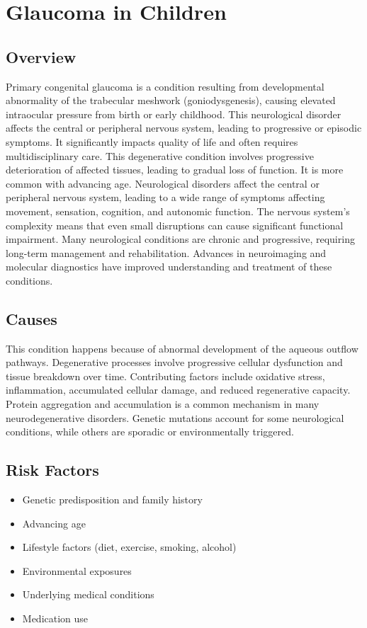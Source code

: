 \chapter{Glaucoma in Children}
\label{sec:Glaucoma in Children}

\section{Overview}
Primary congenital glaucoma is a condition resulting from developmental abnormality of the trabecular meshwork (goniodysgenesis), causing elevated intraocular pressure from birth or early childhood. This neurological disorder affects the central or peripheral nervous system, leading to progressive or episodic symptoms. It significantly impacts quality of life and often requires multidisciplinary care. This degenerative condition involves progressive deterioration of affected tissues, leading to gradual loss of function. It is more common with advancing age. Neurological disorders affect the central or peripheral nervous system, leading to a wide range of symptoms affecting movement, sensation, cognition, and autonomic function. The nervous system's complexity means that even small disruptions can cause significant functional impairment. Many neurological conditions are chronic and progressive, requiring long-term management and rehabilitation. Advances in neuroimaging and molecular diagnostics have improved understanding and treatment of these conditions.
\section{Causes}
This condition happens because of abnormal development of the aqueous outflow pathways.   Degenerative processes involve progressive cellular dysfunction and tissue breakdown over time. Contributing factors include oxidative stress, inflammation, accumulated cellular damage, and reduced regenerative capacity.  Protein aggregation and accumulation is a common mechanism in many neurodegenerative disorders.  Genetic mutations account for some neurological conditions, while others are sporadic or environmentally triggered.   
\section{Risk Factors}
\begin{itemize}[noitemsep]
  \item Genetic predisposition and family history
  \item Advancing age
  \item Lifestyle factors (diet, exercise, smoking, alcohol)
  \item Environmental exposures
  \item Underlying medical conditions
  \item Medication use
\end{itemize}
